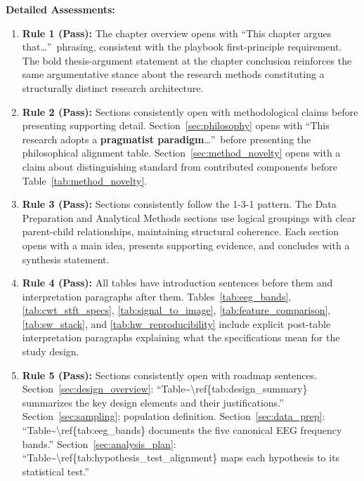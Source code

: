 \noindent\textbf{Detailed Assessments:}

\begin{enumerate}[nosep, leftmargin=*]
\item \textbf{Rule 1 (Pass):} The chapter overview opens with ``This chapter argues that\ldots''\ phrasing, consistent with the playbook first-principle requirement. The bold thesis-argument statement at the chapter conclusion reinforces the same argumentative stance about the research methods constituting a structurally distinct research architecture.

\item \textbf{Rule 2 (Pass):} Sections consistently open with methodological claims before presenting supporting detail. Section~\ref{sec:philosophy} opens with ``This research adopts a \textbf{pragmatist paradigm}\ldots''\ before presenting the philosophical alignment table. Section~\ref{sec:method_novelty} opens with a claim about distinguishing standard from contributed components before Table~\ref{tab:method_novelty}.

\item \textbf{Rule 3 (Pass):} Sections consistently follow the 1-3-1 pattern. The Data Preparation and Analytical Methods sections use logical groupings with clear parent-child relationships, maintaining structural coherence. Each section opens with a main idea, presents supporting evidence, and concludes with a synthesis statement.

\item \textbf{Rule 4 (Pass):} All tables have introduction sentences before them and interpretation paragraphs after them. Tables~\ref{tab:eeg_bands}, \ref{tab:cwt_stft_specs}, \ref{tab:signal_to_image}, \ref{tab:feature_comparison}, \ref{tab:sw_stack}, and \ref{tab:hw_reproducibility} include explicit post-table interpretation paragraphs explaining what the specifications mean for the study design.

\item \textbf{Rule 5 (Pass):} Sections consistently open with roadmap sentences. Section~\ref{sec:design_overview}: ``Table\textasciitilde\textbackslash ref\{tab:design\_summary\} summarizes the key design elements and their justifications.'' Section~\ref{sec:sampling}: population definition. Section~\ref{sec:data_prep}: ``Table\textasciitilde\textbackslash ref\{tab:eeg\_bands\} documents the five canonical EEG frequency bands.'' Section~\ref{sec:analysis_plan}: ``Table\textasciitilde\textbackslash ref\{tab:hypothesis\_test\_alignment\} maps each hypothesis to its statistical test.''


\end{enumerate}
